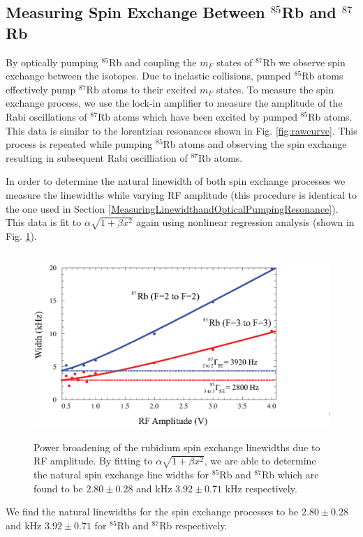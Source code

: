 \subsection{Measuring Spin Exchange Between $^{85}$Rb and $^{87}$Rb}\label{MeasuringSpinExchange}
By optically pumping $^{85}$Rb and coupling the $m_F$ states of $^{87}$Rb we observe spin exchange between the isotopes. Due to inelastic collisions, pumped $^{85}$Rb atoms effectively pump $^{87}$Rb atoms to their excited $m_F$ states.  To measure the spin exchange process, we use the lock-in amplifier to measure the amplitude of the Rabi oscillations of $^{87}$Rb atoms which have been excited by pumped $^{85}$Rb atoms.  This data is similar to the lorentzian resonances shown in Fig. \ref{fig:rawcurve}.  This process is repeated while pumping $^{85}$Rb atoms and observing the spin exchange resulting in subsequent Rabi oscilliation of $^{87}$Rb atoms.

In order to determine the natural linewidth of both spin exchange processes we measure the linewidths while varying RF amplitude (this procedure is identical to the one used in Section \ref{MeasuringLinewidthandOpticalPumpingResonance}).  This data is fit to $\alpha \sqrt{1+\beta x^2}$ again using nonlinear regression analysis (shown in Fig. \ref{fig: spinexchange}).
\begin{figure}[htbp]
\begin{center}
\includegraphics[height=70mm]{./figures/spin_exchange.eps}
\caption{\small{Power broadening of the rubidium spin exchange linewidths due to RF amplitude. By fitting to $\alpha \sqrt{1+\beta x^2}$, we are able to determine the natural spin exchange line widths for $^{85}$Rb and $^{87}$Rb which are found to be $2.80 \pm 0.28$ and kHz $3.92 \pm 0.71$ kHz respectively.}}\label{fig: spinexchange}
\end{center}
\end{figure}
We find the natural linewidths for the spin exchange processes to be $2.80 \pm 0.28$ and kHz $3.92 \pm 0.71$ for $^{85}$Rb and $^{87}$Rb respectively.